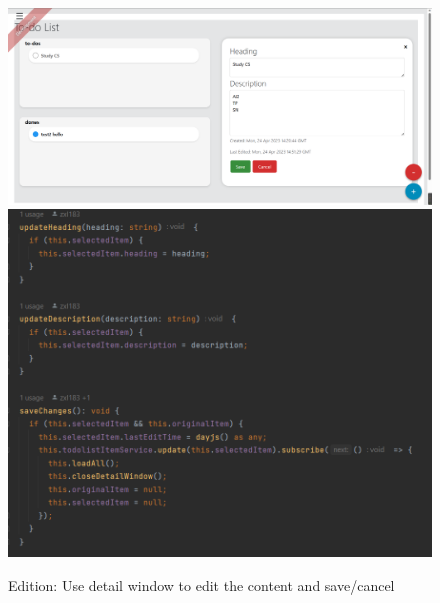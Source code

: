 \documentclass[a4paper]{article}
\begin{document}
\begin{minipage}{\textwidth}
\begin{figure}[H]
  \begin{minipage}{0.6\textwidth}
    \centering
    \includegraphics[width=\linewidth]{./images/Interface_Edit.png} 
  \end{minipage}\hfill
  \begin{minipage}{0.4\textwidth}
    \centering
    \includegraphics[width=\linewidth]{./images/Backend_Edit.png}
  \end{minipage}
  Edition: Use detail window to edit the content and save/cancel
  

\end{figure}
\end{minipage}
\end{document}
